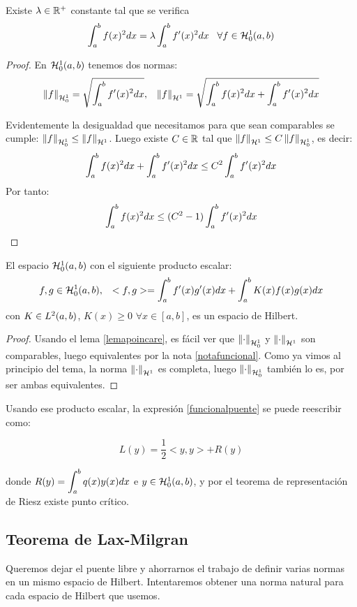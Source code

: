 \begin{prop}
\label{lemapoincare}
Existe $\lambda\in\R^+$ constante tal que se verifica
\[
\integral{a}{b}{f(x)^2dx}=\lambda\integral{a}{b}{f'(x)^2dx} \espacio \forall f\in\sobolevcero{1}
\]
\end{prop}

\begin{proof}

En $\sobolevcero{1}$ tenemos dos normas:
\[
\normasobolevcero{1}{f} = \sqrt{\integral{a}{b}{f'(x)^2dx}}, \espacio \normasobolev{1}{f}=\sqrt{\integral{a}{b}{f(x)^2dx}+\integral{a}{b}{f'(x)^2dx}}
\]

Evidentemente la desigualdad que necesitamos para que sean comparables se cumple: $\normasobolevcero{1}{f}\leq \normasobolev{1}{f}$. Luego existe $C\in\R$ tal que $\normasobolev{1}{f}\leq C\normasobolevcero{1}{f}$, es decir:
\[
\integral{a}{b}{f(x)^2dx}+\integral{a}{b}{f'(x)^2dx}\leq C^2\integral{a}{b}{f'(x)^2dx}
\]
Por tanto:
\[
\integral{a}{b}{f(x)^2dx}\leq (C^2-1)\integral{a}{b}{f'(x)^2dx}
\]

\end{proof}

\begin{prop}
El espacio $\sobolevcero[a,b]{1}$ con el siguiente producto escalar:
\[
f,g\in\sobolevcero[a,b]{1}, \espacio <f,g>=\integral{a}{b}{f'(x)g'(x)dx}+\integral{a}{b}{K(x)f(x)g(x)dx}
\]
con $K\in\lebesgue{2}$, $K(x)\geq 0$ $\forall x\in[a,b]$, es un espacio de Hilbert.
\end{prop}
\begin{proof}
Usando el lema \ref{lemapoincare}, es fácil ver que $\normasobolevcero{1}{\cdot}$ y $\normasobolev{1}{\cdot}$ son comparables, luego equivalentes por la nota \ref{notafuncional}. Como ya vimos al principio del tema, la norma $\normasobolev{1}{\cdot}$ es completa, luego $\normasobolevcero{1}{\cdot}$ también lo es, por ser ambas equivalentes.
\end{proof}

Usando ese producto escalar, la expresión \eqref{funcionalpuente} se puede reescribir como:

\[
L(y)=\frac{1}{2}<y,y>+R(y)
\]

donde $R(y)=\integral{a}{b}{q(x)y(x)dx}$ e $y\in\sobolevcero{1}$, y por el teorema de representación de Riesz existe punto crítico.

\subsection{Teorema de Lax-Milgran}

Queremos dejar el puente libre y ahorrarnos el trabajo de definir varias normas en un mismo espacio de Hilbert. Intentaremos obtener una norma natural para cada espacio de Hilbert que usemos.